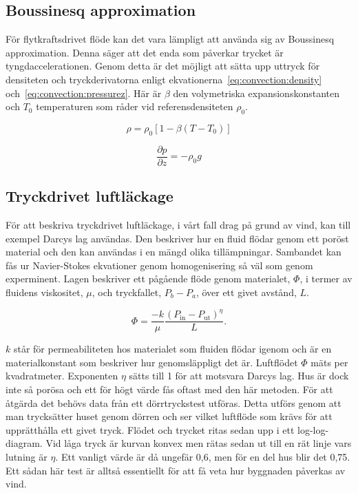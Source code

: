 
\subsection{Boussinesq approximation}

För flytkraftsdrivet flöde kan det vara lämpligt att använda sig av
Boussinesq approximation. Denna säger att det enda som påverkar trycket är
tyngdaccelerationen. Genom detta är det möjligt att sätta upp uttryck för densiteten
och tryckderivatorna enligt ekvationerna~\eqref{eq:convection:density}
och~\eqref{eq:convection:pressurez}. Här är
$\beta$ den volymetriska expansionskonstanten och
$T_0$ temperaturen som råder vid referensdensiteten $\rho_0$.

\begin{equation}
\label{eq:convection:density}
\rho = \rho_0[1-\beta(T-T_0)]
\end{equation}

\begin{equation}
\label{eq:convection:pressurez}
\frac{\partial p}{\partial z} = -\rho_0g
\end{equation}

\subsection{Tryckdrivet luftläckage}
\label{subsec:darcy}

För att beskriva tryckdrivet luftläckage, i vårt fall drag på grund av vind, kan till exempel Darcys lag användas. Den beskriver hur en fluid flödar genom ett poröst material och den kan användas i en mängd olika tillämpningar. Sambandet kan fås ur Navier-Stokes ekvationer genom homogenisering så väl som genom experminent. Lagen beskriver ett pågående flöde genom materialet, $\Phi$, i termer av fluidens viskositet, $\mu$, och tryckfallet, $P_b - P_a$, över ett givet avstånd, $L$.

\begin{equation}
\Phi=\frac{-k}{\mu} \frac{(P_\text{in} - P_\text{ut})^\eta}{L}.
\end{equation}
    
$k$ står för permeabiliteten hos materialet som fluiden flödar igenom och är en 
materialkonstant som beskriver hur genomsläppligt det är. Luftflödet $\Phi$ mäts per 
kvadratmeter. Exponenten $\eta$ sätts till 1 för att motsvara Darcys lag. Hus är dock inte så
 porösa och ett för högt värde fås oftast med den här metoden. För att åtgärda det behövs 
 data från ett dörrtryckstest utföras. Detta utförs genom att man trycksätter huset genom 
 dörren och ser vilket luftflöde som krävs för att upprätthålla ett givet tryck. Flödet och trycket 
 ritas sedan upp i ett log-log-diagram. Vid låga tryck är kurvan konvex men rätas sedan ut till 
 en rät linje vars lutning är $\eta$. Ett vanligt värde är då ungefär 0,6, men för en del hus blir 
 det 0,75.\cite{sasic} Ett sådan här test är alltså essentiellt för att få veta hur byggnaden 
 påverkas av vind.
 
